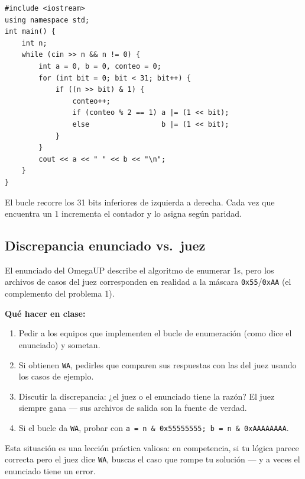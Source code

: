 \documentclass[12pt, oneside]{article}
\begin{document}
\begin{notaprofesor}
\begin{verbatim}
#include <iostream>
using namespace std;
int main() {
    int n;
    while (cin >> n && n != 0) {
        int a = 0, b = 0, conteo = 0;
        for (int bit = 0; bit < 31; bit++) {
            if ((n >> bit) & 1) {
                conteo++;
                if (conteo % 2 == 1) a |= (1 << bit);
                else                 b |= (1 << bit);
            }
        }
        cout << a << " " << b << "\n";
    }
}
\end{verbatim}
  El bucle recorre los 31 bits inferiores de izquierda a derecha.
  Cada vez que encuentra un 1 incrementa el contador y lo asigna según paridad.
\end{notaprofesor}

\subsection{Discrepancia enunciado vs.\ juez}

\begin{notaprofesor}
  El enunciado del OmegaUP describe el algoritmo de enumerar 1s, pero los
  archivos de casos del juez corresponden en realidad a la máscara
  \texttt{0x55}/\texttt{0xAA} (el complemento del problema 1).

  \textbf{Qué hacer en clase:}
  \begin{enumerate}
    \item Pedir a los equipos que implementen el bucle de enumeración
          (como dice el enunciado) y sometan.
    \item Si obtienen \texttt{WA}, pedirles que comparen sus respuestas con
          las del juez usando los casos de ejemplo.
    \item Discutir la discrepancia: ¿el juez o el enunciado tiene la razón?
          El juez siempre gana — sus archivos de salida son la fuente de verdad.
    \item Si el bucle da \texttt{WA}, probar con
          \texttt{a = n \& 0x55555555; b = n \& 0xAAAAAAAA}.
  \end{enumerate}

  Esta situación es una lección práctica valiosa: en competencia, si tu
  lógica parece correcta pero el juez dice \texttt{WA}, buscas el caso que
  rompe tu solución — y a veces el enunciado tiene un error.
\end{notaprofesor}
\end{document}
